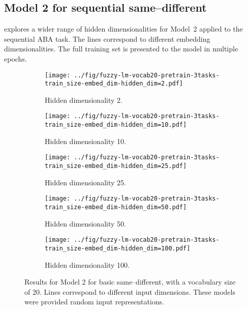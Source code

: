 \subsection{Model 2 for sequential same--different}

 explores a wider range of hidden dimensionalities for Model~2 applied to the sequential ABA task. The lines correspond to different embedding dimensionalities. The full training set is presented to the model in multiple epochs.

\begin{figure}[H]
  \centering

  \begin{subfigure}{0.45\linewidth}
    \texttt{[image: ../fig/fuzzy-lm-vocab20-pretrain-3tasks-train\_size-embed\_dim-hidden\_dim=2.pdf]}
    \caption{Hidden dimensionality 2.}
  \end{subfigure}
  \hfill
  \begin{subfigure}{0.45\linewidth}
    \texttt{[image: ../fig/fuzzy-lm-vocab20-pretrain-3tasks-train\_size-embed\_dim-hidden\_dim=10.pdf]}
    \caption{Hidden dimensionality 10.}
  \end{subfigure}

  \vspace{24pt}

  \begin{subfigure}{0.45\linewidth}
    \texttt{[image: ../fig/fuzzy-lm-vocab20-pretrain-3tasks-train\_size-embed\_dim-hidden\_dim=25.pdf]}
    \caption{Hidden dimensionality 25.}
  \end{subfigure}
  \hfill
  \begin{subfigure}{0.45\linewidth}
    \texttt{[image: ../fig/fuzzy-lm-vocab20-pretrain-3tasks-train\_size-embed\_dim-hidden\_dim=50.pdf]}
    \caption{Hidden dimensionality 50.}
  \end{subfigure}

  \vspace{24pt}

  \begin{subfigure}{0.45\linewidth}
    \texttt{[image: ../fig/fuzzy-lm-vocab20-pretrain-3tasks-train\_size-embed\_dim-hidden\_dim=100.pdf]}
    \caption{Hidden dimensionality 100.}
    \label{fig:model2-rep}
  \end{subfigure}

  \caption{Results for Model 2 for basic same--different, with a vocabulary size of 20. Lines correspond to different input dimensions. These models were provided random input representations.}
  \label{fig:model2}
\end{figure}




